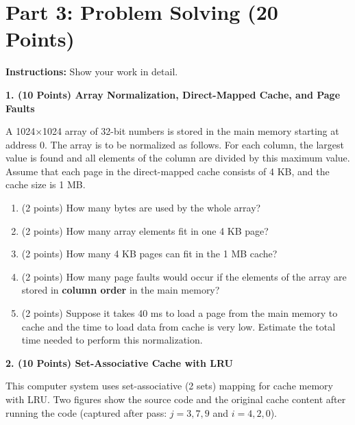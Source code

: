 \documentclass[a4paper,12pt]{article}
\begin{document}
\newpage

\section*{Part 3: Problem Solving (20 Points)}
\textbf{Instructions:} Show your work in detail.

\textbf{1. (10 Points) Array Normalization, Direct-Mapped Cache, and Page Faults}

A 1024$\times$1024 array of 32-bit numbers is stored in the main memory starting at address 0. The array is to be normalized as follows. For each column, the largest value is found and all elements of the column are divided by this maximum value. Assume that each page in the direct-mapped cache consists of 4 KB, and the cache size is 1 MB.

\begin{enumerate}[label=\textbf{1.\arabic*}]
    \item (2 points) How many bytes are used by the whole array?
    \vspace{1.0cm}

    \item (2 points) How many array elements fit in one 4 KB page?
    \vspace{1.0cm}

    \item (2 points) How many 4 KB pages can fit in the 1 MB cache?
    \vspace{1.0cm}

    \item (2 points) How many page faults would occur if the elements of the array are stored in \textbf{column order} in the main memory?
    \vspace{1.2cm}

    \item (2 points) Suppose it takes 40 ms to load a page from the main memory to cache and the time to load data from cache is very low. Estimate the total time needed to perform this normalization.
    \vspace{1.4cm}
\end{enumerate}

\newpage

\textbf{2. (10 Points) Set-Associative Cache with LRU}

This computer system uses set-associative (2 sets) mapping for cache memory with LRU. Two figures show the source code and the original cache content after running the code (captured after pass: $j=3,7,9$ and $i=4,2,0$).
\end{document}
